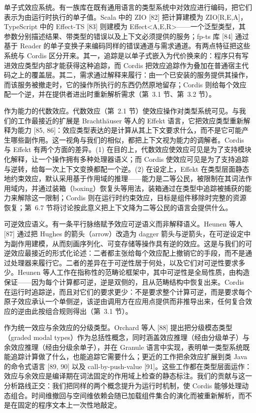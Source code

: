 \documentclass[
  10
]{article}
\begin{document}
单子式效应系统。有一族库在既有通用语言的类型系统中对效应进行编码，把它们表示为由运行时执行的单子值。Scala 中的 ZIO {[}82{]} 把计算建模为 ZIO{[}R,E,A{]}，TypeScript 中的 Effect-TS {[}83{]} 则建模为 Effect\textless A,E,R\textgreater——一个泛型类型，其参数分别描述结果、带类型的错误以及上下文必须提供的服务；fp-ts 库 {[}84{]} 通过基于 Reader 的单子变换子来编码同样的错误通道与需求通道。有两点特征把这些系统与 Cordis 区分开来。其一，追踪是以单子式嵌入为代价换来的：程序只有写进效应类型内部才能获得这种追踪，而 Cordis 把效应追踪作为叠加在普通宿主代码之上的覆盖层。其二，需求通过解释来履行：由一个已安装的服务提供其操作，而该服务被撤走时，它的操作所执行的东西仍然原地留存；Cordis 则给每个效应配一个逆，并在提供者进出时重新解析需求（第~3.1 节、第~3.2 节）。

作为能力的代数效应。代数效应（第~2.1 节）使效应操作对类型系统可见。与我们的工作最接近的扩展是 Brachthäuser 等人的 Effekt 语言，它把效应类型重新解释为能力 {[}85, 86{]}：效应类型表达的是计算从其上下文要求什么，而不是它可能产生哪些副作用。这一视角与我们的相似，都把上下文视为能力的调解者。Cordis 与 Effekt 有两个方面的差异。(1) 在目的上，代数效应使效应可见是为了支持模块化解释，让一个操作拥有多种处理器语义；而 Cordis 使效应可见是为了支持追踪与逆转，给每一次上下文变换都配一个逆。(2) 在设定上，Effekt 在类型层面静态地约束效应，默认采用基于作用域的推理——能力是二等公民，被限制在其词法作用域内，并通过装箱（boxing）恢复头等用法，装箱通过在类型中追踪被捕获的能力来解除这一限制；Cordis 则在运行时约束效应，目标是组件移除时完整的资源恢复；第~6.7 节将讨论按此意义把上下文降为二等公民的语言会提供什么。

可逆效应语义。有一条平行脉络赋予效应可逆语义而非解释语义。Heunen 等人 {[}87{]} 通过把 Hughes 的箭头（arrow）改造为 dagger 箭头与逆箭头，在可逆设定中为副作用建模，从而刻画序列化、可变存储等操作具有逆的效应。这是与我们的可逆效应最接近的形式化论述：二者都主张给每个效应配上撤销它的手段，而不是通过处理器来履行它。二者的差异在于可逆性居于何处，以及它们对可逆性要求多少。Heunen 等人工作在指称性的范畴论框架中，其中可逆性是全局性质，由构造保证——因为每个计算都可逆，逆是双侧的，且从范畴结构中恢复出来。Cordis 在运行时追踪逆，而且对它们的要求更少：不是要求整个计算可逆，而是要求每个原子效应承认一个单侧逆，该逆由调用方在应用点提供而非推导出来，任何复合效应的逆由此按组合规则得出（第~3.1 节）。

作为统一效应与余效应的分级类型。Orchard 等人 {[}88{]} 提出把分级模态类型（graded modal types）作为总括性概念，同时涵盖效应推理（经由分级单子）与余效应推理（经由分级余单子），并在 Granule 语言中实现，表明单一类型系统既能追踪计算做了什么，也能追踪它需要什么；更近的工作把余效应扩展到类 Java 的命令式语言 {[}89, 90{]} 以及 call-by-push-value {[}91{]}。这些工作都在类型层面运作：效应与余效应是编译期在词法固定的作用域上检查的静态标注。我们的贡献与这一分析路线正交：我们把同样的两个概念提升为运行时机制，使 Cordis 能够处理动态组合。时间维撤回与空间维依赖会随已加载组件集合的演化而被重新解析，而不是在固定的程序文本上一次性地敲定。
\end{document}
